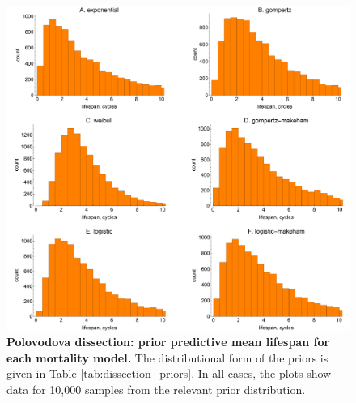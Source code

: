 \documentclass[12pt]{article}
\begin{document}
{\begin{figure}[ht]
	\centerline{\includegraphics[width=1\textwidth]{./Figure_files/dissection_lifespanPriorsParity.pdf}}
	\caption{\textbf{Polovodova dissection: prior predictive mean lifespan for each mortality model.} The distributional form of the priors is given in Table \ref{tab:dissection_priors}. In all cases, the plots show data for 10,000 samples from the relevant prior distribution.}\label{fig:dissection_lifespanPriorsParity}
\end{figure}

}
\end{document}
